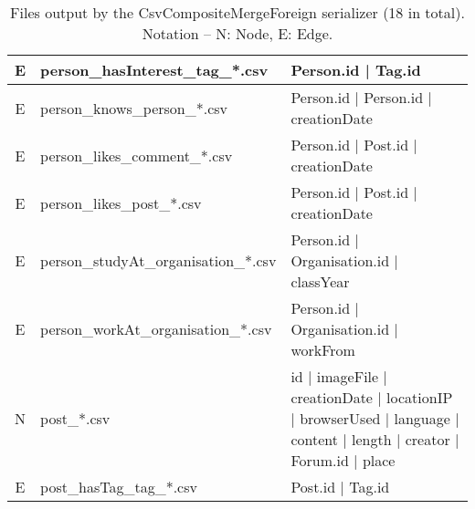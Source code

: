 \begin{table}[htb]
{\begin{tabular}{|c|p{4.3cm}|p{12.4cm}|}
        E                       & person\_hasInterest\_tag\_*.csv      & Person.id | Tag.id                                                                                                  \\ \hline
        E                       & person\_knows\_person\_*.csv         & Person.id | Person.id | creationDate                                                                                \\ \hline
        E                       & person\_likes\_comment\_*.csv        & Person.id | Post.id | creationDate                                                                                  \\ \hline
        E                       & person\_likes\_post\_*.csv           & Person.id | Post.id | creationDate                                                                                  \\ \hline
        E                       & person\_studyAt\_organisation\_*.csv & Person.id | Organisation.id | classYear                                                                             \\ \hline
        E                       & person\_workAt\_organisation\_*.csv  & Person.id | Organisation.id | workFrom                                                                              \\ \hline
        N                       & post\_*.csv                          & id | imageFile | creationDate | locationIP | browserUsed | language | content | length | creator | Forum.id | place \\ \hline
        E                       & post\_hasTag\_tag\_*.csv             & Post.id | Tag.id                                                                                                    \\ \hline
    \end{tabular}}
    \caption{Files output by the CsvCompositeMergeForeign serializer (18 in total). Notation -- N: Node, E: Edge.}
    \label{table:csv_composite_merge_foreign}
\end{table}
